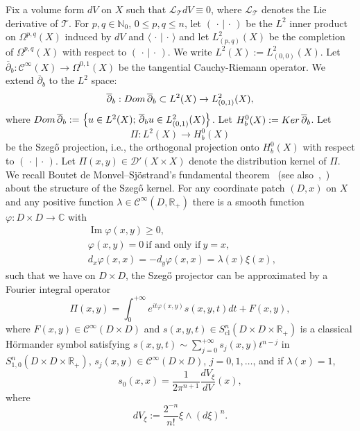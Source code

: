 \documentclass[12pt]{amsart}
\theoremstyle{definition}
\theoremstyle{named}
\numberwithin{equation}{subsection}
\newcommand{\R}{\mathbb{R}}
\newcommand{\C}{\mathbb{C}}
\newcommand{\ddbar}{\overline\partial}
\newcommand{\set}[1]{\left\{#1\right\}}
\newcommand{\To}{\rightarrow}
\def\cC{\mathscr{C}}
\begin{document}
 Fix a volume form $dV$ on $X$ such that $\mathcal{L}_{\mathcal{T}}dV\equiv 0$, where $\mathcal{L}_{\mathcal{T}}$ denotes the Lie derivative of $\mathcal{T}$. 
 For $p, q\in\mathbb N_0$, $0\leq p,q\leq n$, let $(\,\cdot\,|\,\cdot\,)$ be the $L^2$ inner product on $\Omega^{p,q}(X)$ induced by $dV$ and $\langle\,\cdot\,|\,\cdot\,\rangle$ and let $L^2_{(p,q)}(X)$ be the completion of $\Omega^{p,q}(X)$ with respect to $(\,\cdot\,|\,\cdot\,)$. We write $L^2(X):=L^2_{(0,0)}(X)$. Let $\ddbar_b: \cC^\infty(X)\To\Omega^{0,1}(X)$ 
 be the tangential Cauchy-Riemann operator. We extend $\ddbar_b$ to the $L^2$ space:
 \[\ddbar_b: {\rm Dom\,}\ddbar_b\subset L^2(X)\To L^2_{(0,1)}(X),\]
 where ${\rm Dom\,}\ddbar_b:=\set{u\in L^2(X);\, \ddbar_bu\in L^2_{(0,1)}(X)}$. Let $H^0_b(X):={\rm Ker\,}\ddbar_b$. Let \[\Pi: L^2(X)\to H^0_b(X)\]
 be the Szeg\H{o} projection, i.e., the orthogonal projection onto $H^0_b(X)$ with respect to $(\,\cdot\,|\,\cdot\,)$. Let $\Pi(x,y)\in\mathcal{D}'(X\times X)$ denote the distribution kernel of $\Pi$. We recall
Boutet de Monvel--Sj\"ostrand's fundamental theorem~\cite{Boutet_Sjoestrand_Szego_Bergman_kernel_1975} (see also~\cite{Hsiao_Szego_Bergman_kernel_q_forms_2010},~\cite{Hsiao_Marinescu_Szego_lower_energy_2017}) about the structure of the 
Szeg\H{o} kernel.
For any coordinate patch $(D,x)$ on $X$ and any positive function \(\lambda\in\mathscr{C}^\infty(D,\R_+)\)
there is a smooth function $\varphi:D\times D\to\C$ with
\begin{equation}
\label{Eq:PhaseFuncMainThm}
\begin{split}
&\operatorname{Im}\varphi(x,y)\geq 0,\\
&\varphi(x,y)=0~\text{if and only if}~y=x,\\
&d_x\varphi(x,x)=-d_y\varphi(x,x)=\lambda(x)\xi(x),\ \,
\end{split}
\end{equation} 
such that we have on $D\times D$, the Szeg\H{o} projector
can be approximated by a Fourier integral operator
\begin{equation}\label{eq:PiFIO}
\Pi(x,y)=\int_0^{+\infty} 
e^{it\varphi(x,y)}s(x,y,t)dt+F(x,y),
\end{equation}
where $F(x,y)\in\cC^\infty(D\times D)$ and $s(x,y,t)
\in S^{n}_{\operatorname{cl}}(D\times D\times{\R}_+)$ 
is a classical H\"ormander symbol satisfying $s(x,y,t)
\sim\sum_{j=0}^{+\infty}s_j(x,y)t^{n-j}$ in 
$S^{n}_{1,0}(D\times D\times{\R}_+)$, $s_j(x,y)\in\cC^\infty(D\times D)$, $j=0,1,\ldots$, and if $\lambda(x)=1$,
\begin{equation}
\label{eq:leading term s_0 intro}
s_0(x,x)=\frac{1}{2\pi^{n+1}}\frac{dV_\xi}{dV}(x),
\end{equation} 
 where 
 \begin{equation}\label{e-gue241115ycd}
 dV_{\xi}:=\frac{2^{-n}}{n!}\xi\wedge \left(d\xi\right)^n.
 \end{equation} 
 
\end{document}
